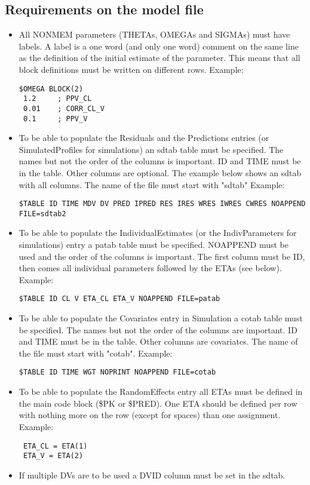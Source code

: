 \subsection{Requirements on the model file}
\begin{itemize}
    \item All NONMEM parameters (THETAs, OMEGAs and SIGMAs) must have labels. A label is a one word (and only one word) comment on the same line as the definition of the initial estimate of the parameter. This means that all block definitions must be written on different rows. Example:
        \begin{verbatim}
$OMEGA BLOCK(2)
 1.2     ; PPV_CL
 0.01    ; CORR_CL_V
 0.1     ; PPV_V
        \end{verbatim}
    \item To be able to populate the Residuals and the Predictions entries (or SimulatedProfiles for simulations) an sdtab table must be specified. The names but not the order of the columns is important. ID and TIME must be in the table. Other columns are optional. The example below shows an sdtab with all columns. The name of the file must start with "sdtab" Example:
        \begin{verbatim}
$TABLE ID TIME MDV DV PRED IPRED RES IRES WRES IWRES CWRES NOAPPEND FILE=sdtab2
        \end{verbatim}
    \item To be able to populate the IndividualEstimates (or the IndivParameters for simulations) entry a patab table must be specified. NOAPPEND must be used and the order of the columns is important. The first column must be ID, then comes all individual parameters followed by the ETAs (see below). Example:
        \begin{verbatim}
$TABLE ID CL V ETA_CL ETA_V NOAPPEND FILE=patab
        \end{verbatim}
    \item To be able to populate the Covariates entry in Simulation a cotab table must be specified. The names but not the order of the columns are important. ID and TIME must be in the table. Other columns are covariates. The name of the file must start with "cotab". Example:
        \begin{verbatim}
$TABLE ID TIME WGT NOPRINT NOAPPEND FILE=cotab
        \end{verbatim}
    \item To be able to populate the RandomEffects entry all ETAs must be defined in the main code block (\$PK or \$PRED). One ETA should be defined per row with nothing more on the row (except for spaces) than one assignment. Example:
        \begin{verbatim}
 ETA_CL = ETA(1)
 ETA_V = ETA(2)
        \end{verbatim}
    \item If multiple DVs are to be used a DVID column must be set in the sdtab.
\end{itemize}


